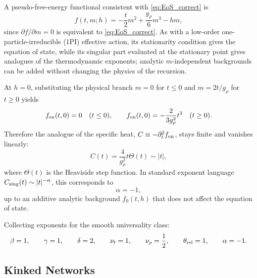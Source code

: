 \vspace{0.25em}
\noindent
A pseudo-free-energy functional consistent with \eqref{eq:EoS_correct} is
\begin{equation}
f(t,m;h) = -\frac{t}{2} m^2 + \frac{g_\rho}{6} m^3 - h m,
\label{eq:free_energy_correct}
\end{equation}
since \(\partial f/\partial m=0\) is equivalent to \eqref{eq:EoS_correct}. As with a low-order one-particle-irreducible (1PI) effective action, its stationarity condition gives the equation of state, while its singular part evaluated at the stationary point gives analogues of the thermodynamic exponents; analytic \(m\)-independent backgrounds can be added without changing the physics of the recursion.

At \(h=0\), substituting the physical branch
\(m=0\) for \(t\le 0\) and \(m=2t/g_\rho\) for \(t\ge 0\) yields
\begin{equation}
f_{\rm on}(t,0)=0 \quad (t\le 0), \qquad f_{\rm on}(t,0)=-\frac{2}{3g_\rho^{2}} t^{3}\quad (t\ge 0).
\end{equation}
Therefore the analogue of the specific heat, \(C\equiv -\partial_t^{2} f_{\rm on}\), stays finite and vanishes linearly:
\begin{equation}
C(t)=\frac{4}{g_\rho^{2}} t \Theta(t)\sim |t|,
\end{equation}
where $\Theta(t)$ is the Heaviside step function. In standard exponent language \(C_{\rm sing}(t)\sim |t|^{-\alpha}\), this corresponds to
\begin{equation}
\alpha=-1,
\end{equation}
up to an additive analytic background \(f_0(t,h)\) that does not affect the equation of state.

Collecting exponents for the smooth universality class:
\begin{equation}
\beta=1, \qquad \gamma=1, \qquad \delta=2, \qquad \nu_t=1, \qquad \nu_\rho=\frac{1}{2}, \qquad \theta_{\rm rel}=1, \qquad \alpha=-1.
\end{equation}

\subsection{Kinked Networks}
\label{sec:kinks}

